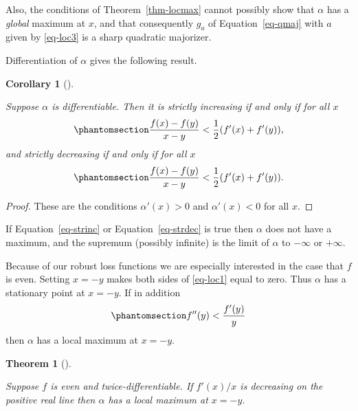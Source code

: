 \documentclass[
  12pt,
  letterpaper,
  DIV=11,
  numbers=noendperiod]{scrartcl}
\theoremstyle{plain}
\theoremstyle{plain}
\newtheorem{theorem}{Theorem}[section]
\theoremstyle{plain}
\newtheorem{corollary}{Corollary}[section]
\theoremstyle{definition}
\theoremstyle{definition}
\theoremstyle{remark}
\begin{document}
Also, the conditions of Theorem~\ref{thm-locmax} cannot possibly show
that \(\alpha\) has a \emph{global} maximum at \(x\), and that
consequently \(g_a\) of Equation~\ref{eq-qmaj} with \(a\) given by
\eqref{eq-loc3} is a sharp quadratic majorizer.

Differentiation of \(\alpha\) gives the following result.

\begin{corollary}[]\protect\hypertarget{cor-incdec}{}\label{cor-incdec}

Suppose \(\alpha\) is differentiable. Then it is strictly increasing if
and only if for all \(x\)
\begin{equation}\phantomsection\label{eq-strinc}{
\frac{f(x)-f(y)}{x-y}<\frac12(f'(x)+f'(y)),
}\end{equation} and strictly decreasing if and only if for all \(x\)
\begin{equation}\phantomsection\label{eq-strdec}{
\frac{f(x)-f(y)}{x-y}<\frac12(f'(x)+f'(y)).
}\end{equation}

\end{corollary}

\begin{proof}
These are the conditions \(\alpha'(x)>0\) and \(\alpha'(x)<0\) for all
\(x\).
\end{proof}

If Equation~\ref{eq-strinc} or Equation~\ref{eq-strdec} is true then
\(\alpha\) does not have a maximum, and the supremum (possibly infinite)
is the limit of \(\alpha\) to \(-\infty\) or \(+\infty\).

Because of our robust loss functions we are especially interested in the
case that \(f\) is even. Setting \(x=-y\) makes both sides of
\eqref{eq-loc1} equal to zero. Thus \(\alpha\) has a stationary point at
\(x=-y\). If in addition \begin{equation}\phantomsection\label{eq-miny}{
f''(y)<\frac{f'(y)}{y}
}\end{equation} then \(\alpha\) has a local maximum at \(x=-y\).

\begin{theorem}[]\protect\hypertarget{thm-evena}{}\label{thm-evena}

Suppose \(f\) is even and twice-differentiable. If \(f'(x)/x\) is
decreasing on the positive real line then \(\alpha\) has a local maximum
at \(x=-y\).

\end{theorem}
\end{document}
